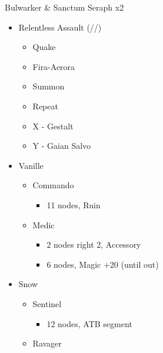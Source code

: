 \begin{multicols}{2}
\renewcommand{\second}{[2] Relentless Assault (\rav/\rav/\com)}

\begin{battle}[0:14]{Bulwarker \& Sanctum Seraph x2}
  \begin{itemize}
    \item \second
          \begin{itemize}
            \item Quake
            \item Fira-Aerora
            \item Summon
            \item Repeat
            \item X - Gestalt
            \item Y - Gaian Salvo
          \end{itemize}
  \end{itemize}
\end{battle}
\vfill
\begin{menu}
  \begin{itemize}
    \crystarium
    \begin{itemize}
      \item Vanille
            \begin{itemize}
              \item Commando
                    \begin{itemize}
                      \item 11 nodes, Ruin
                    \end{itemize}
              \item Medic
                    \begin{itemize}
                      \item 2 nodes right 2, Accessory
                      \item 6 nodes, Magic +20 (until out)
                    \end{itemize}
            \end{itemize}
      \item Snow
            \begin{itemize}
              \item Sentinel
                    \begin{itemize}
                      \item 12 nodes, ATB segment
                    \end{itemize}
              \item Ravager
                    \begin{itemize}

\end{itemize}
\end{itemize}
\end{itemize}
\end{itemize}
\end{menu}
\end{multicols}
